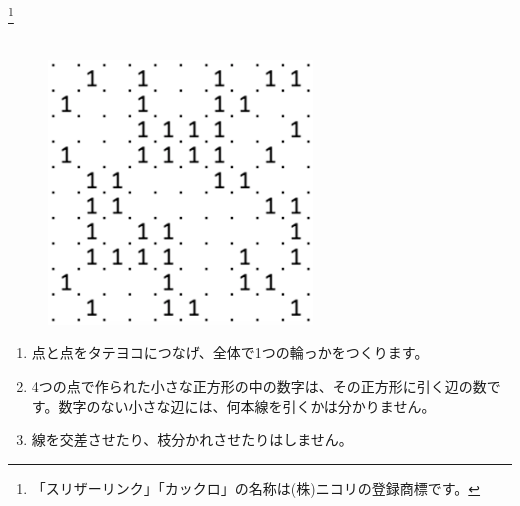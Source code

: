 \footnote{「スリザーリンク」「カックロ」の名称は(株)ニコリの登録商標です。}
\leavevmode \\
\\
\begin{figure}[h]
\centering
\includegraphics[width =7cm,bb = 0 0 202 202]{sp1slitherlink}
\end{figure}
\begin{enumerate}
\renewcommand{\labelenumi}{\theenumi.}
\item 点と点をタテヨコにつなげ、全体で1つの輪っかをつくります。
\item  4つの点で作られた小さな正方形の中の数字は、その正方形に引く辺の数です。数字のない小さな辺には、何本線を引くかは分かりません。
\item 線を交差させたり、枝分かれさせたりはしません。
\end{enumerate}
